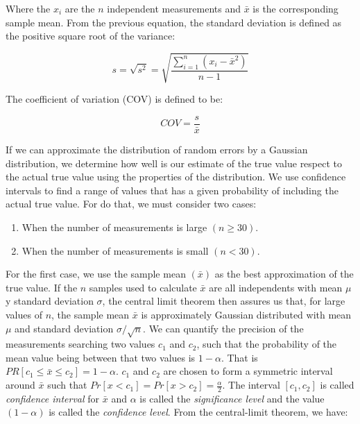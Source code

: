 \documentclass{latex/classes/thesis}
\begin{document}
Where the \(x_i\) are the \(n\) independent measurements and \(\bar{x}\) is
the corresponding sample mean. From the previous equation, the standard
deviation is defined as the positive square root of the variance:

\begin{equation}
s = \sqrt{s^2} = \sqrt{\frac{\sum_{i = 1}^n(x_i - \bar{x}^2)}{n - 1}}
\end{equation}

The coefficient of variation (COV) is defined to be:

\begin{equation}
  COV = \frac{s}{\bar{x}}
\end{equation}

If we can approximate the distribution of random errors by a Gaussian
distribution, we determine how well is our estimate of the true value respect
to the actual true value using the properties of the distribution. We use
confidence intervals to find a range of values that has a given probability
of including the actual true value. For do that, we must consider two cases:

\begin{enumerate}
\item When the number of measurements is large \((n \ge 30)\).
\item When the number of measurements is small \((n < 30)\).
\end{enumerate}

For the first case, we use the sample mean \((\bar{x})\) as the best
approximation of the true value. If the \(n\) samples used to calculate
\(\bar{x}\) are all independents with mean \(\mu\) y standard deviation
\(\sigma\), the central limit theorem then assures us that, for large values
of \(n\), the sample mean \(\bar{x}\) is approximately Gaussian distributed
with mean \(\mu\) and standard deviation \(\sigma / \sqrt{n}\). We can
quantify the precision of the measurements searching two values \(c_1\) and
\(c_2\), such that the probability of the mean value being between that two
values is \(1 - \alpha\). That is \(PR[c_1 \le \bar{x} \le c_2] = 1 -
   \alpha\). \(c_1\) and \(c_2\) are chosen to form a symmetric interval around
\(\bar{x}\) such that \(Pr[x < c_1] = Pr[x > c_2] = \frac{\alpha}{2}\). The
interval \([c_1, c_2]\) is called \emph{confidence interval} for \(\bar{x}\) and
\(\alpha\) is called the \emph{significance level} and the value \((1 - \alpha)\) is
called the \emph{confidence level}. From the central-limit theorem, we have:
\end{document}
